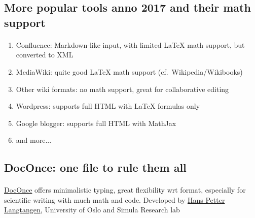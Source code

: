 \documentclass[%
oneside,                 %
final,                   %
10pt]{article}
\begin{document}
\noindent




\subsection*{More popular tools anno 2017 and their math support}

\paragraph{}
\begin{enumerate}
\item Confluence: Markdown-like input, with limited {\LaTeX} math support, but converted to XML

\item MediaWiki: quite good {\LaTeX} math support (cf.~Wikipedia/Wikibooks)

\item Other wiki formats: no math support, great for collaborative editing

\item Wordpress: supports full HTML with {\LaTeX} formulas only

\item Google blogger: supports full HTML with MathJax

\item and more...
\end{enumerate}

\noindent






\subsection*{DocOnce: one file to rule them all}

\paragraph{}

\href{{http://hplgit.github.io/doconce/doc/web/index.html}}{DocOnce} offers minimalistic typing, great flexibility wrt format, especially for scientific writing with much math and code. Developed by \href{{http://hplgit.github.io/homepage/index.html}}{Hans Petter Langtangen}, University of Oslo and Simula Research lab
\end{document}
